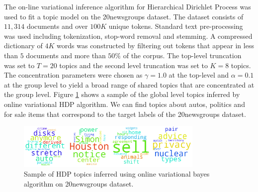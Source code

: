 The on-line variational inference algorithm for Hierarchical Dirichlet Process was used to fit a topic model on the 20newsgroups dataset. The dataset consists of $11,314$ documents and over $100K$ unique tokens. Standard text pre-processing was used including tokenization, stop-word removal and stemming. A compressed dictionary of $4K$ words was constructed by filtering out tokens that appear in less than $5$ documents and more than $50\%$ of the corpus. The top-level truncation was set to $T=20$ topics and the second level truncation was set to $K=8$ topics. The concentration parameters were chosen as $\gamma = 1.0$ at the top-level and $\alpha=0.1$ at the group level to yield a broad range of shared topics that are concentrated at the group level. Figure \ref{fig:hdp_topics_vb} shows a sample of the global level topics inferred by online variational HDP algorithm. We can find topics about autos, politics and for sale items that correspond to the target labels of the 20newsgroups dataset.

\begin{figure}[thpb]
    \centering
    \includegraphics[width=0.8\textwidth, trim={10 10 10 10}]{figures/hdp_topics.png}
    \caption{Sample of HDP topics inferred using online variational bayes algorithm on 20newsgroups dataset.}
    \label{fig:hdp_topics_vb}
\end{figure}
